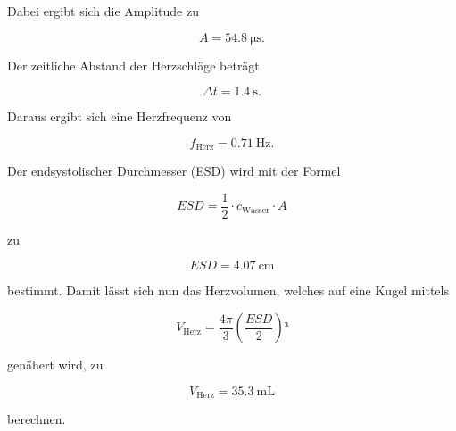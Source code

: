 Dabei ergibt sich die Amplitude zu

\begin{equation*}
A = \SI{54.8}{\micro\second}.
\end{equation*}

Der zeitliche Abstand der Herzschläge beträgt 

\begin{equation*}
\Delta t = \SI{1.4}{\second}.
\end{equation*}

Daraus ergibt sich eine Herzfrequenz von 

\begin{equation*}
f_\text{Herz} = \SI{0.71}{\hertz}.
\end{equation*}

Der endsystolischer Durchmesser (ESD) wird mit der Formel 

\begin{equation}
ESD = \frac{1}{2}\cdot c_\text{Wasser} \cdot A
\end{equation}

zu

\begin{equation*}
ESD = \SI{4.07}{\centi\meter}
\end{equation*}

bestimmt. Damit lässt sich nun das Herzvolumen, welches auf eine Kugel mittels 

\begin{equation*}
V_\text{Herz} = \frac{4\pi}{3}\left(\frac{ESD}{2}\right)³
\end{equation*}

genähert wird, zu 

\begin{equation*}
V_\text{Herz} = \SI{35.3}{\milli\liter}
\end{equation*}

berechnen. 